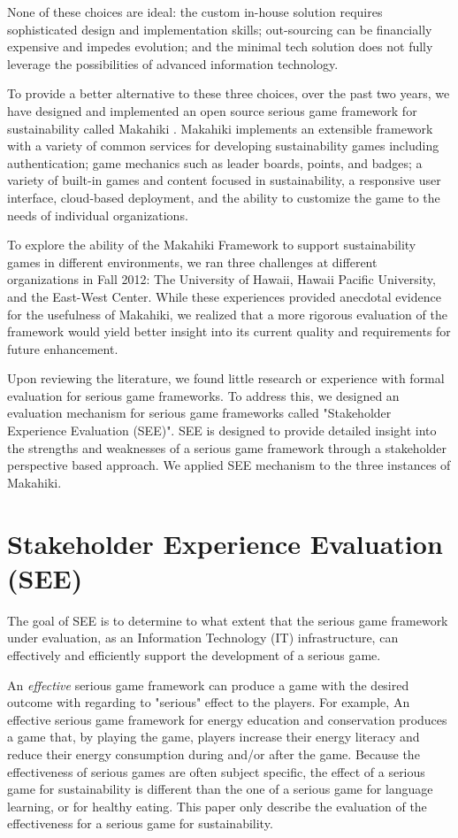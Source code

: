 \documentclass{sigchi}
\begin{document}
None of these choices are ideal: the custom in-house solution requires
sophisticated design and implementation skills; out-sourcing can be
financially expensive and impedes evolution; and the minimal tech
solution does not fully leverage the possibilities of advanced
information technology.

To provide a better alternative to these three choices, over the past
two years, we have designed and implemented an open source serious
game framework for sustainability called Makahiki
\cite{csdl2-12-06}. Makahiki implements an extensible framework with a
variety of common services for developing sustainability games
including authentication; game mechanics such as leader boards, points,
and badges; a variety of built-in games and content focused in
sustainability, a responsive user interface, cloud-based deployment,
and the ability to customize the game to the needs of individual
organizations.

To explore the ability of the Makahiki Framework to support
sustainability games in different environments, we ran three
challenges at different organizations in Fall 2012: The University of
Hawaii, Hawaii Pacific University, and the East-West Center. While
these experiences provided anecdotal evidence for the usefulness of
Makahiki, we realized that a more rigorous evaluation of the framework
would yield better insight into its current quality and requirements
for future enhancement.

Upon reviewing the literature, we found little research or experience
with formal evaluation for serious game frameworks. To address this,
we designed an evaluation mechanism for serious game frameworks called
"Stakeholder Experience Evaluation (SEE)". SEE is designed to provide
detailed insight into the strengths and weaknesses of a serious game
framework through a stakeholder perspective based approach. We applied
SEE mechanism to the three instances of Makahiki. 

\section{Stakeholder Experience Evaluation (SEE)}

The goal of SEE is to determine to what extent that the serious game
framework under evaluation, as an Information Technology (IT)
infrastructure, can effectively and efficiently support the
development of a serious game.

An \emph{effective} serious game framework can produce a game with the
desired outcome with regarding to "serious" effect to the players. For
example, An effective serious game framework for energy education and
conservation produces a game that, by playing the game, players
increase their energy literacy and reduce their energy consumption
during and/or after the game. Because the effectiveness of serious games
are often subject specific, the effect of a serious game for
sustainability is different than the one of a serious game for
language learning, or for healthy eating. This paper only describe the
evaluation of the effectiveness for a serious game for sustainability.
\end{document}
